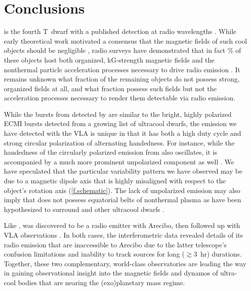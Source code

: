 \documentclass[twocolumn, times]{aastex6}
\begin{document}
\section{Conclusions}
\label{s.conc}

 is the fourth T~dwarf with a published detection at radio
wavelengths \citep{rw12, rw16, wbz13, khp+16}. While early theoretical work
motivated a consensus that the magnetic fields of such cool objects should be
negligible , radio surveys have demonstrated that in fact
\% of these objects host both organized, kG-strength magnetic fields and
the nonthermal particle acceleration processes necessary to drive radio
emission \citep{rw13, rw16, khp+16}. It remains unknown what fraction of the
remaining objects do not possess strong, organized fields at all, and what
fraction possess such fields but not the acceleration processes necessary to
render them detectable via radio emission.

While the bursts from  detected by \citet{rw16} are similar to
the bright, highly polarized ECMI bursts detected from a growing list of
ultracool dwarfs, the emission we have detected with the VLA is unique in that
it has both a high duty cycle and strong circular polarization of alternating
handedness. For instance, while the handedness of the circularly polarized
emission from  also oscillates, it is accompanied by a much more
prominent unpolarized component as well \citep{mbi+11, wbi+15}. We have
speculated that the particular variability pattern we have observed may be due
to a magnetic dipole axis that is highly misaligned with respect to the
object's rotation axis (\autoref{f.schematic}). The lack of unpolarized
emission may also imply that  does not possess equatorial belts
of nonthermal plasma as have been hypothesized to surround  and
other ultracool dwarfs \citep{wcb14, wbi+15}.

Like ,  was discovered to be a radio emitter with
Arecibo, then followed up with VLA observations \citep{rw12, wbz13}. In both
cases, the interferometric data revealed details of its radio emission that
are inaccessible to Arecibo due to the latter telescope's confusion
limitations and inability to track sources for long ($\gtrsim$3~hr) durations.
Together, these two complementary, world-class observatories are leading the
way in gaining observational insight into the magnetic fields and dynamos of
ultra-cool bodies that are nearing the (exo)planetary mass regime.
\end{document}
